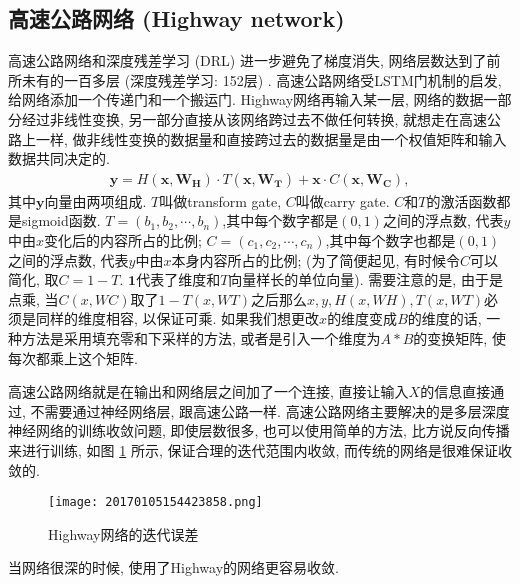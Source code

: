 \subsection{高速公路网络 (Highway network)}
高速公路网络和深度残差学习 (DRL) 进一步避免了梯度消失, 网络层数达到了前所未有的一百多层 (深度残差学习: 152层) \cite{HeCVPR2016-9590, NIPS2015-5850}.
高速公路网络受LSTM门机制的启发, 给网络添加一个传递门和一个搬运门.
Highway网络再输入某一层, 网络的数据一部分经过非线性变换, 另一部分直接从该网络跨过去不做任何转换, 就想走在高速公路上一样,
做非线性变换的数据量和直接跨过去的数据量是由一个权值矩阵和输入数据共同决定的.
\begin{align}
    \mathbf{y}=H\left (\mathbf{x}, \mathbf{W}_{\mathbf{H}}\right) \cdot T\left (\mathbf{x}, \mathbf{W}_{\mathbf{T}}\right)+\mathbf{x} \cdot C\left (\mathbf{x}, \mathbf{W}_{\mathbf{C}}\right),
\end{align}
其中$\bm y$向量由两项组成. $T$叫做transform gate, $C$叫做carry gate. $C$和$T$的激活函数都是sigmoid函数.
$T= (b_1, b_2, \cdots, b_n)$,其中每个数字都是$(0, 1)$之间的浮点数, 代表$y$中由$x$变化后的内容所占的比例;
$C= (c_1, c_2, \cdots, c_n)$,其中每个数字也都是$(0, 1)$之间的浮点数, 代表$y$中由$x$本身内容所占的比例;
(为了简便起见, 有时候令$C$可以简化, 取$C=1-T$. $\bm 1$代表了维度和$T$向量样长的单位向量).
需要注意的是, 由于是点乘, 当$C (x,WC)$取了$1-T (x,WT)$之后那么$x, y, H(x,WH), T(x,WT)$必须是同样的维度相容, 以保证可乘.
如果我们想更改$x$的维度变成$B$的维度的话, 一种方法是采用填充零和下采样的方法, 或者是引入一个维度为$A*B$的变换矩阵, 使每次都乘上这个矩阵.

高速公路网络就是在输出和网络层之间加了一个连接, 直接让输入$X$的信息直接通过, 不需要通过神经网络层, 跟高速公路一样.
高速公路网络主要解决的是多层深度神经网络的训练收敛问题, 即使层数很多, 也可以使用简单的方法, 比方说反向传播来进行训练,
如图 \ref{20170105154423858} 所示, 保证合理的迭代范围内收敛, 而传统的网络是很难保证收敛的.
\begin{figure}[H]
    \centering
    \texttt{[image: 20170105154423858.png]}
    \caption{Highway网络的迭代误差}
    \label{20170105154423858}
    \vspace{-0.4cm}
\end{figure}
当网络很深的时候, 使用了Highway的网络更容易收敛.
